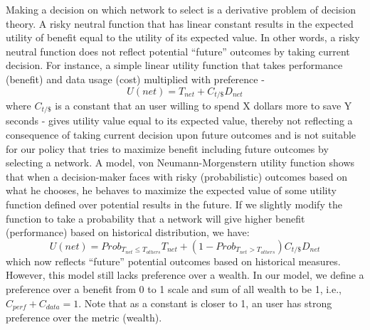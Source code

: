 \documentclass[12pt]{article}
\begin{document}
Making a decision on which network to select is a derivative problem of decision
theory.
A risky neutral function that has linear constant results in the expected
utility of benefit equal to the utility of its expected value. 
In other words, a risky neutral function does not reflect potential ``future''
outcomes by taking current decision. For instance, a simple linear utility
function that takes performance (benefit) and data usage (cost) multiplied with
preference - 
$$U(net) = T_{net} + C_{t/\$}D_{net}$$
where $C_{t/\$}$ is a constant that an user willing to spend X dollars more to
save Y seconds - gives utility value equal to its expected value, thereby not
reflecting a consequence of taking current decision upon future outcomes and is
not suitable for our policy that tries to maximize benefit including future
outcomes by selecting a network.
A model, von Neumann-Morgenstern utility function shows that when a
decision-maker faces with risky (probabilistic) outcomes based on what he
chooses, he behaves to maximize the expected value of some utility function
defined over potential results in the future.
If we slightly modify the function to take a probability that a network will
give higher benefit (performance) based on historical distribution, we have:
$$U(net) = Prob_{ T_{net} \leq T_{others} }T_{net} + (1-Prob_{ T_{net} >
T_{others}})C_{t/\$}D_{net}$$
which now reflects ``future'' potential outcomes based on historical measures.
However, this model still lacks preference over a wealth. In our model, we
define a preference over a benefit from 0 to 1 scale and sum of all wealth to be
1, i.e., $C_{perf} + C_{data} = 1$. Note that as a constant is closer to 1, an
user has strong preference over the metric (wealth). 






\newpage

% 
  
\end{document}
